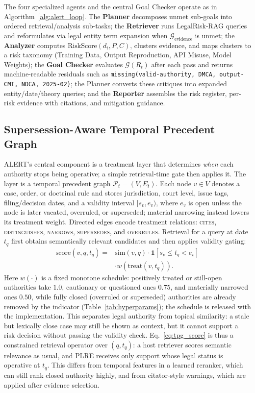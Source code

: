 The four specialized agents and the central Goal Checker operate as in Algorithm~\ref{alg:alert_loop}. The \textbf{Planner} decomposes unmet sub-goals into ordered retrieval/analysis sub-tasks; the \textbf{Retriever} runs LegalRisk-RAG queries and reformulates via legal entity term expansion when $\mathcal{G}_{\text{evidence}}$ is unmet; the \textbf{Analyzer} computes $\text{RiskScore}(d_i, P, C)$, clusters evidence, and maps clusters to a risk taxonomy (Training Data, Output Reproduction, API Misuse, Model Weights); the \textbf{Goal Checker} evaluates $\mathcal{G}(R_t)$ after each pass and returns machine-readable residuals such as \texttt{missing(valid-authority, DMCA, output-CMI, NDCA, 2025-02)}; the Planner converts these critiques into expanded entity/date/theory queries; and the \textbf{Reporter} assembles the risk register, per-risk evidence with citations, and mitigation guidance.

\subsection{Supersession-Aware Temporal Precedent Graph}
\label{sec:tpg}

ALERT's central component is a treatment layer that determines \emph{when} each authority stops being operative; a simple retrieval-time gate then applies it. The layer is a temporal precedent graph $\mathcal{P}_t=(V,E_t)$. Each node $v\in V$ denotes a case, order, or doctrinal rule and stores jurisdiction, court level, issue tags, filing/decision dates, and a validity interval $[s_v,e_v)$, where $e_v$ is open unless the node is later vacated, overruled, or superseded; material narrowing instead lowers its treatment weight. Directed edges encode treatment relations: \textsc{cites}, \textsc{distinguishes}, \textsc{narrows}, \textsc{supersedes}, and \textsc{overrules}. Retrieval for a query at date $t_q$ first obtains semantically relevant candidates and then applies validity gating:
\begin{equation}
\label{eq:tpg_score}
\begin{split}
  \mathrm{score}(v,q,t_q)={}&\mathrm{sim}(v,q)\cdot \mathbf{1}[s_v\!\le\! t_q\!<\! e_v]\\
  &\cdot w(\mathrm{treat}(v,t_q)).
\end{split}
\end{equation}
Here $w(\cdot)$ is a fixed monotone schedule: positively treated or still-open authorities take $1.0$, cautionary or questioned ones $0.75$, and materially narrowed ones $0.50$, while fully closed (overruled or superseded) authorities are already removed by the indicator (Table~\ref{tab:hyperparams}); the schedule is released with the implementation. This separates legal authority from topical similarity: a stale but lexically close case may still be shown as context, but it cannot support a risk decision without passing the validity check. Eq.~\eqref{eq:tpg_score} is thus a constrained retrieval operator over $(q,t_q)$: a host retriever scores semantic relevance as usual, and PLRE receives only support whose legal status is operative at $t_q$. This differs from temporal features in a learned reranker, which can still rank closed authority highly, and from citator-style warnings, which are applied after evidence selection.

